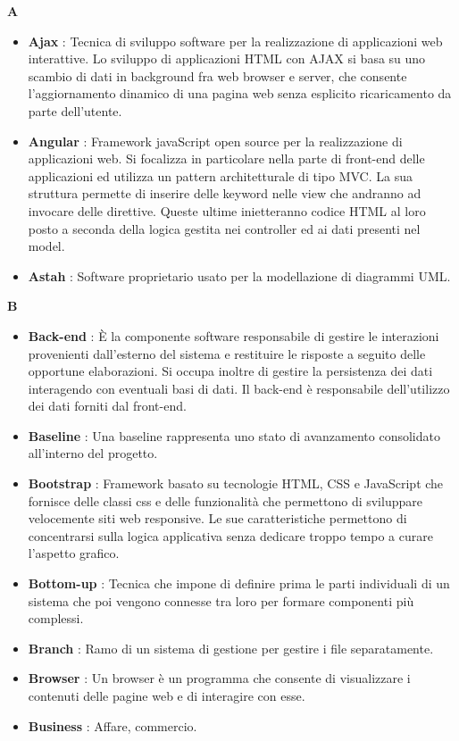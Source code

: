 {\huge \textbf{A}}
\begin{flushleft}
\begin{itemize}[label={}]
\item \textbf{Ajax} : Tecnica di sviluppo software per la realizzazione di applicazioni web interattive. Lo sviluppo di applicazioni HTML con AJAX si basa su uno scambio di dati in background fra web browser e server, che consente l'aggiornamento dinamico di una pagina web senza esplicito ricaricamento da parte dell'utente.
\item \textbf{Angular} : Framework javaScript open source per la realizzazione di applicazioni web. Si focalizza in particolare nella parte di front-end delle applicazioni ed utilizza un pattern architetturale di tipo MVC. La sua struttura permette di inserire delle keyword nelle view che andranno ad invocare delle direttive. Queste ultime inietteranno codice HTML al loro posto a seconda della logica gestita nei controller ed ai dati presenti nel model.
\item \textbf{Astah} : Software proprietario usato per la modellazione di diagrammi UML.
\end{itemize}
\end{flushleft}
\newpage
{\huge \textbf{B}}
\begin{flushleft}
\begin{itemize}[label={}]
\item \textbf{Back-end} : È la componente software responsabile di gestire le interazioni provenienti dall'esterno del sistema e restituire le risposte a seguito delle opportune elaborazioni. Si occupa inoltre di gestire la persistenza dei dati interagendo con eventuali basi di dati. Il back-end è responsabile dell'utilizzo dei dati forniti dal front-end.
\item \textbf{Baseline} : Una baseline rappresenta uno stato di avanzamento consolidato all'interno del progetto.
\item \textbf{Bootstrap} : Framework basato su tecnologie HTML, CSS e JavaScript che fornisce delle classi css e delle funzionalità che permettono di sviluppare velocemente siti web responsive. Le sue caratteristiche permettono di concentrarsi sulla logica applicativa senza dedicare troppo tempo a curare l'aspetto grafico.
\item \textbf{Bottom-up} : Tecnica che impone di definire prima le parti individuali di un sistema che poi vengono connesse tra loro per formare componenti più complessi.
\item \textbf{Branch} : Ramo di un sistema di gestione per gestire i file separatamente.
\item \textbf{Browser} : Un browser è un programma che consente di visualizzare i contenuti delle pagine web e di interagire con esse.
\item \textbf{Business} : Affare, commercio.
\end{itemize}
\end{flushleft}
